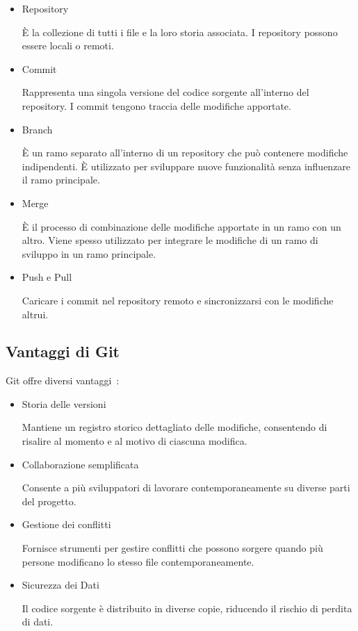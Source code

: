 \begin{itemize}
    \item Repository
    
    È la collezione di tutti i file e la loro storia associata. I repository possono essere locali o remoti.

    \item Commit
    
    Rappresenta una singola versione del codice sorgente all'interno del repository. I commit tengono traccia delle modifiche apportate.
    
    \item Branch
    
    È un ramo separato all'interno di un repository che può contenere modifiche indipendenti. È utilizzato per sviluppare nuove funzionalità senza influenzare il ramo principale.

    \item Merge
    
    È il processo di combinazione delle modifiche apportate in un ramo con un altro. Viene spesso utilizzato per integrare le modifiche di un ramo di sviluppo in un ramo principale.

    \item Push e Pull
    
    Caricare i commit nel repository remoto e sincronizzarsi con le modifiche altrui.

\end{itemize}

\subsection{Vantaggi di Git}
Git offre diversi vantaggi~\cite{GIT2}:

\begin{itemize}
    \item Storia delle versioni
    
    Mantiene un registro storico dettagliato delle modifiche, consentendo di risalire al momento e al motivo di ciascuna modifica.

    \item Collaborazione semplificata
    
    Consente a più sviluppatori di lavorare contemporaneamente su diverse parti del progetto.

    \item Gestione dei conflitti
    
    Fornisce strumenti per gestire conflitti che possono sorgere quando più persone modificano lo stesso file contemporaneamente.

    \item Sicurezza dei Dati
    
    Il codice sorgente è distribuito in diverse copie, riducendo il rischio di perdita di dati.
\end{itemize}


